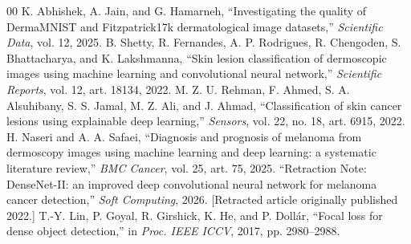 \documentclass[conference]{IEEEtran}
\begin{document}
\begin{thebibliography}{00}
 K. Abhishek, A. Jain, and G. Hamarneh, ``Investigating the quality of DermaMNIST and Fitzpatrick17k dermatological image datasets,'' \emph{Scientific Data}, vol. 12, 2025.
 B. Shetty, R. Fernandes, A. P. Rodrigues, R. Chengoden, S. Bhattacharya, and K. Lakshmanna, ``Skin lesion classification of dermoscopic images using machine learning and convolutional neural network,'' \emph{Scientific Reports}, vol. 12, art. 18134, 2022.
 M. Z. U. Rehman, F. Ahmed, S. A. Alsuhibany, S. S. Jamal, M. Z. Ali, and J. Ahmad, ``Classification of skin cancer lesions using explainable deep learning,'' \emph{Sensors}, vol. 22, no. 18, art. 6915, 2022.
 H. Naseri and A. A. Safaei, ``Diagnosis and prognosis of melanoma from dermoscopy images using machine learning and deep learning: a systematic literature review,'' \emph{BMC Cancer}, vol. 25, art. 75, 2025.
 ``Retraction Note: DenseNet-II: an improved deep convolutional neural network for melanoma cancer detection,'' \emph{Soft Computing}, 2026. [Retracted article originally published 2022.]
 T.-Y. Lin, P. Goyal, R. Girshick, K. He, and P. Doll\'ar, ``Focal loss for dense object detection,'' in \emph{Proc. IEEE ICCV}, 2017, pp. 2980--2988.
\end{thebibliography}
\end{document}
